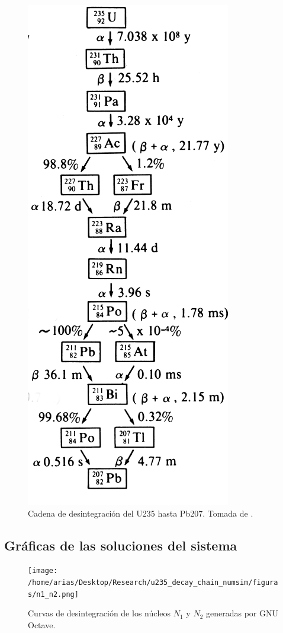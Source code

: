 \begin{figure}[H]
	\centering
	\includegraphics[scale=0.67]{imagenes/cadenaluz.png}
	\caption{Cadena de desintegración del U235 hasta Pb207. Tomada de \cite{HUBENER2003211}.}
	\label{cadenadelu235}
\end{figure}

\subsection{Gráficas de las soluciones del sistema}

\begin{figure}[H]
	\centering
	\texttt{[image: /home/arias/Desktop/Research/u235\_decay\_chain\_numsim/figuras/n1\_n2.png]}\label{n1n2}\caption{Curvas de desintegración de los núcleos $N_1$ y $N_2$ generadas por GNU Octave.}
\end{figure}


